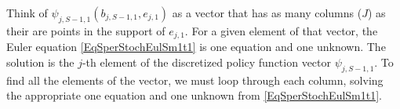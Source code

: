 \documentclass[letterpaper,12pt]{article}
\theoremstyle{definition}
\numberwithin{equation}{section}
\numberwithin{exercise}{section}
\begin{document}
\begin{spacing}{1.5}
      Think of $\psi_{j,S-1,1}\left(b_{j,S-1,1},e_{j,1}\right)$ as a vector that has as many columns ($J$) as their are points in the support of $e_{j,1}$. For a given element of that vector, the Euler equation \eqref{EqSperStochEulSm1t1} is one equation and one unknown. The solution is the $j$-th element of the discretized policy function vector $\psi_{j,S-1,1}$. To find all the elements of the vector, we must loop through each column, solving the appropriate one equation and one unknown from \eqref{EqSperStochEulSm1t1}.




\end{spacing}
\end{document}
